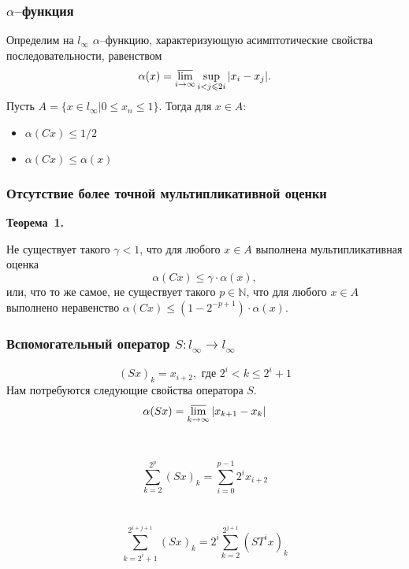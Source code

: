 \documentclass[10pt,pdf,hyperref={unicode}]{beamer}
\begin{document}
\begin{frame}\frametitle{$\alpha$--функция}

	Определим на $l_\infty$ $\alpha$--функцию,
	характеризующую асимптотические свойства последовательности,
	равенством
	$$
		\alpha(x) = \varlimsup_{i\to\infty}\sup_{i < j \leqslant 2i} |x_i - x_j|.
	$$
	Пусть $A = \{x\in l_\infty | 0 \leqslant x_n \leqslant 1\}$.
	Тогда для $x\in A$:
	\begin{itemize}
		\item
			$\alpha(Cx) \leqslant 1/2$
		\item
			$\alpha(Cx) \leqslant \alpha(x)$
	\end{itemize}
\end{frame}

\begin{frame}\frametitle{Отсутствие более точной мультипликативной оценки}
	\textbf{Теорема~1.}

	Не существует такого $\gamma < 1$,
	что для любого $x\in A$ выполнена мультипликативная оценка
	$$
		\alpha(Cx) \leqslant \gamma \cdot \alpha(x)
	,
	$$
	или, что то же самое, не существует такого $p\in \mathbb{N}$,
	что для любого $x\in A$ выполнено неравенство
	$
		\alpha(Cx) \leqslant (1-2^{-p+1})\cdot \alpha(x).
	$
\end{frame}

\begin{frame}\frametitle{Вспомогательный оператор $S:l_\infty \to l_\infty$}
	\begin{equation*}\label{operator_S}
		(Sx)_k = x_{i+2}, \mbox{ где } 2^i < k \leqslant 2^i+1
	\end{equation*}
	Нам потребуются следующие свойства оператора $S$.
	\begin{equation}\label{alpha_S}
		\alpha(Sx) = \varlimsup_{k\to\infty} |x_{k+1} - x_{k}|
	\end{equation}
	\\~\\
	\begin{equation}\label{summa_S_less}
		\sum_{k=2}^{2^p} (Sx)_k =
		\sum_{i=0}^{p-1} 2^i x_{i+2}
	\end{equation}
	\\~\\
	\begin{equation}\label{summa_S}
		\sum_{k=2^i+1}^{2^{i+j+1}} (Sx)_k =
		2^i\sum_{k=2}^{2^{j+1}} (ST^ix)_k
	\end{equation}
\end{frame}
\end{document}
